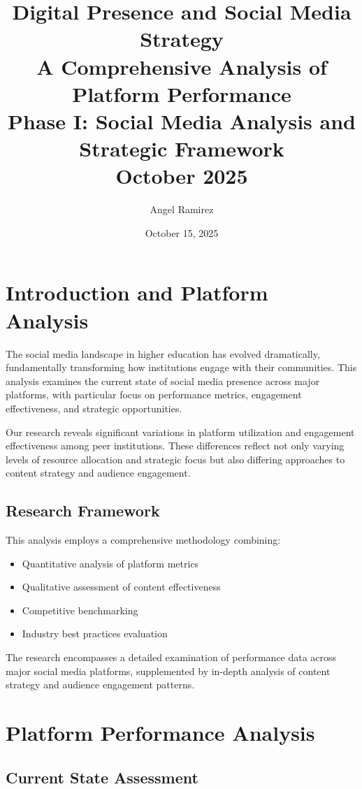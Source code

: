 \documentclass[12pt]{report}
\title{
    \Huge\textbf{Digital Presence and Social Media Strategy}\\[1cm]
    \Large\textbf{A Comprehensive Analysis of Platform Performance}\\[0.5cm]
    \large Phase I: Social Media Analysis and Strategic Framework\\[1cm]
    \normalsize October 2025
}
\author{Angel Ramirez}
\date{October 15, 2025}
\begin{document}
\maketitle

\tableofcontents

\chapter{Introduction and Platform Analysis}

The social media landscape in higher education has evolved dramatically, fundamentally transforming how institutions engage with their communities. This analysis examines the current state of social media presence across major platforms, with particular focus on performance metrics, engagement effectiveness, and strategic opportunities.

Our research reveals significant variations in platform utilization and engagement effectiveness among peer institutions. These differences reflect not only varying levels of resource allocation and strategic focus but also differing approaches to content strategy and audience engagement.

\section{Research Framework}

This analysis employs a comprehensive methodology combining:
\begin{itemize}
    \item Quantitative analysis of platform metrics
    \item Qualitative assessment of content effectiveness
    \item Competitive benchmarking
    \item Industry best practices evaluation
\end{itemize}

The research encompasses a detailed examination of performance data across major social media platforms, supplemented by in-depth analysis of content strategy and audience engagement patterns.

\chapter{Platform Performance Analysis}

\section{Current State Assessment}
\end{document}
